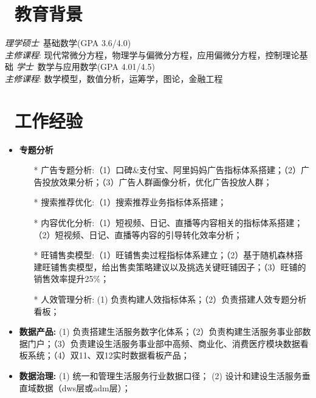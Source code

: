 \documentclass{resume}
\begin{document}


 
\section{\faGraduationCap\  教育背景}
\textit{理学硕士}\ 基础数学(GPA 3.6/4.0)\\
\textit{主修课程}:
现代常微分方程，物理学与偏微分方程，应用偏微分方程，控制理论基础
\textit{学士}\ 数学与应用数学(GPA 4.01/4.5)\\
\textit{主修课程}:
数学模型，数值分析，运筹学，图论，金融工程

\section{\faUsers\ 工作经验}
\role{资深数据分析师}{}
\begin{onehalfspacing}
  \begin{itemize}
    \item \textbf{专题分析}
    \begin{itemize}
      \item[*] 广告专题分析:（1）口碑\&支付宝、阿里妈妈广告指标体系搭建；（2）广告投放效果分析；（3）广告人群画像分析，优化广告投放人群；
      \item[*] 搜索推荐优化:（1）搜索推荐业务指标体系搭建；
      \item[*] 内容优化分析:（1）短视频、日记、直播等内容相关的指标体系搭建；（2）短视频、日记、直播等内容的引导转化效率分析；
      \item[*] 旺铺售卖模型:（1）旺铺售卖过程指标体系建立；（2）基于随机森林搭建旺铺售卖模型，给出售卖策略建议以及挑选关键旺铺因子；（3）旺铺的销售效率提升25\%； 
      \item[*] 人效管理分析: (1) 负责构建人效指标体系；（2）负责搭建人效专题分析看板；
    \end{itemize}
    \item \textbf{数据产品:} (1) 负责搭建生活服务数字化体系；（2）负责构建生活服务事业部数据门户；（3）负责建设生活服务事业部中高频、商业化、消费医疗模块数据看板系统；（4）双11、双12实时数据看板产品；
    \item \textbf{数据治理:} (1) 统一和管理生活服务行业数据口径； (2) 设计和建设生活服务垂直域数据（dws层或adm层）；
  \end{itemize}
\end{onehalfspacing}
\end{document}
